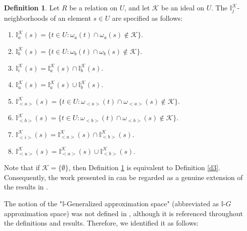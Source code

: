 \documentclass{article}
\theoremstyle{theorem}
\theoremstyle{definition}
\newtheorem{definition}{Definition}[section]
\theoremstyle{remark}
\begin{document}
\begin{definition} \label{d12} \cite{Al-shami 2024} Let $R$ be a relation on $U$, and let $\mathcal{K}$ be an ideal on $U$. The $\mathbb{I}^{\mathcal{K}}_{j}$-neighborhoods of an element $s \in U$ are specified as follows:
\begin{enumerate}
\item $\mathbb{I}^{\mathcal{K}}_{a}(s) = \{t \in U : \omega_{a}(t) \cap \omega_{a}(s) \not\in\mathcal{K}\}$.
\item  $\mathbb{I}^{\mathcal{K}}_{b}(s) = \{t \in U : \omega_{b}(t) \cap \omega_{b}(s) \not\in\mathcal{K}\}$.
\item  $\mathbb{I}^{\mathcal{K}}_{i}(s) = \mathbb{I}^{\mathcal{K}}_{a}(s) \cap \mathbb{I}^{\mathcal{K}}_{b}(s)$.
\item  $\mathbb{I}^{\mathcal{K}}_{u}(s) = \mathbb{I}^{\mathcal{K}}_{a}(s) \cup \mathbb{I}^{\mathcal{K}}_{b}(s)$.
\item  $\mathbb{I}^{\mathcal{K}}_{<a>}(s) = \{t \in U : \omega_{<a>}(t) \cap \omega_{<a>}(s) \not\in\mathcal{K}\}$.
\item  $\mathbb{I}^{\mathcal{K}}_{<b>}(s) = \{t \in U : \omega_{<b>}(t) \cap \omega_{<b>}(s) \not\in\mathcal{K}\}$.
\item  $\mathbb{I}^{\mathcal{K}}_{<i>}(s) = \mathbb{I}^{\mathcal{K}}_{<a>}(s) \cap \mathbb{I}^{\mathcal{K}}_{<b>}(s)$.
\item  $\mathbb{I}^{\mathcal{K}}_{<u>}(s) = \mathbb{I}^{\mathcal{K}}_{<a>}(s) \cup \mathbb{I}^{\mathcal{K}}_{<b>}(s)$.
\end{enumerate}
\end{definition}

Note that if $\mathcal{K} = \{\emptyset\}$, then Definition \ref{d12} is equivalent to Definition \ref{d3}. Consequently, the work presented in \cite{Al-shami 2024} can be regarded as a genuine extension of the results in  \cite{Al-shami 2021}. \newline

The notion of the "$\mathbb{I}$-Generalized approximation space" (abbreviated as $\mathbb{I}$-$G$ approximation space) was not defined in \cite{Al-shami 2024}, although it is referenced throughout the definitions and results. Therefore, we identified it as follows:

\end{document}
